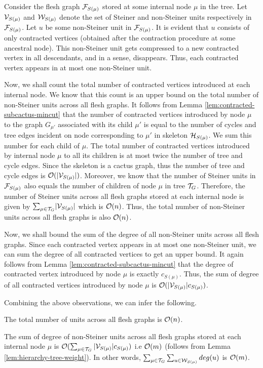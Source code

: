 Consider the flesh graph ${\cal F}_{S(\mu)}$ stored at some internal node $\mu$ in the tree. Let ${\cal V}_{S(\mu)}$ and ${\cal W}_{S(\mu)}$ denote the set of Steiner and non-Steiner units respectively in ${\cal F}_{S(\mu)}$. Let $u$ be some non-Steiner unit in ${\cal F}_{S(\mu)}$. It is evident that $u$ consists of only contracted vertices (obtained after the contraction procedure at some ancestral node). This non-Steiner unit gets compressed to a new contracted vertex in all descendants, and in a sense, disappears. Thus, each contracted vertex appears in at most one non-Steiner unit. 

Now, we shall count the total number of contracted vertices introduced at each internal node. We know that this count is an upper bound on the total number of non-Steiner units across all flesh graphs. It follows from Lemma \ref{lem:contracted-subcactus-mincut} that the number of contracted vertices introduced by node $\mu$ to the graph $G_{\mu'}$ associated with its child $\mu'$ is equal to the number of cycles and tree edges incident on node corresponding to $\mu'$ in skeleton ${\cal H}_{S(\mu)}$. We sum this number for each child of $\mu$. The total number of contracted vertices introduced by internal node $\mu$ to all its children is at most twice the number of tree and cycle edges. Since the skeleton is a cactus graph, thus the number of tree and cycle edges is ${\cal O}(|{\cal V}_{S(\mu)}|)$. Moreover, we know that the number of Steiner units in ${\cal F}_{S(\mu)}$ also equals the number of children of node $\mu$ in tree ${\cal T}_G$. Therefore, the number of Steiner units across all flesh graphs stored at each internal node is given by ${\sum}_{\mu \in {\cal T}_G}|{\cal V}_{S(\mu)}|$ which is ${\cal O}(n)$. Thus, the total number of non-Steiner units across all flesh graphs is also ${\cal O}(n)$.

Now, we shall bound the sum of the degree of all non-Steiner units across all flesh graphs. Since each contracted vertex appears in at most one non-Steiner unit, we can sum the degree of all contracted vertices to get an upper bound. It again follows from Lemma \ref{lem:contracted-subcactus-mincut} that the degree of contracted vertex introduced by node $\mu$ is exactly $c_{S(\mu)}$. Thus, the sum of degree of all contracted vertices introduced by node $\mu$ is ${\cal O}(|{\cal V}_{S(\mu)}|c_{S(\mu)})$.

Combining the above observations, we can infer the following.


\begin{inference}
\label{inf:units-O(n)}
The total number of units across all flesh graphs is ${\cal O}(n)$.
\end{inference}
\begin{inference}
\label{inf:sum-degree}
The sum of degree of non-Steiner units across all flesh graphs stored at each internal node $\mu$ is ${\cal O}(\sum_{\mu \in {\cal T}_G}{|{\cal V}_{S(\mu)}|}c_{S(\mu)})$ i.e ${\cal O}(m)$ (follows from Lemma \ref{lem:hierarchy-tree-weight}). In other words, $\sum_{\mu \in {\cal T}_G} \sum_{u \in {\cal W}_{S(\mu)}}deg(u)$ is ${\cal O}(m)$.
\end{inference}


